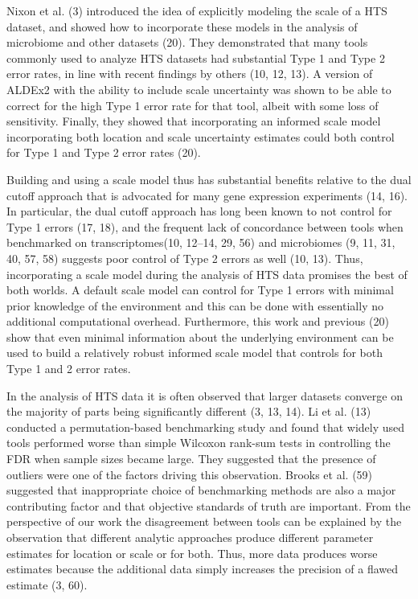 \documentclass[
]{article}
\begin{document}
Nixon et al. (3) introduced the idea of explicitly modeling the scale of
a HTS dataset, and showed how to incorporate these models in the
analysis of microbiome and other datasets (20). They demonstrated that
many tools commonly used to analyze HTS datasets had substantial Type 1
and Type 2 error rates, in line with recent findings by others (10, 12,
13). A version of ALDEx2 with the ability to include scale uncertainty
was shown to be able to correct for the high Type 1 error rate for that
tool, albeit with some loss of sensitivity. Finally, they showed that
incorporating an informed scale model incorporating both location and
scale uncertainty estimates could both control for Type 1 and Type 2
error rates (20).

Building and using a scale model thus has substantial benefits relative
to the dual cutoff approach that is advocated for many gene expression
experiments (14, 16). In particular, the dual cutoff approach has long
been known to not control for Type 1 errors (17, 18), and the frequent
lack of concordance between tools when benchmarked on transcriptomes(10,
12--14, 29, 56) and microbiomes (9, 11, 31, 40, 57, 58) suggests poor
control of Type 2 errors as well (10, 13). Thus, incorporating a scale
model during the analysis of HTS data promises the best of both worlds.
A default scale model can control for Type 1 errors with minimal prior
knowledge of the environment and this can be done with essentially no
additional computational overhead. Furthermore, this work and previous
(20) show that even minimal information about the underlying environment
can be used to build a relatively robust informed scale model that
controls for both Type 1 and 2 error rates.

In the analysis of HTS data it is often observed that larger datasets
converge on the majority of parts being significantly different (3, 13,
14). Li et al. (13) conducted a permutation-based benchmarking study and
found that widely used tools performed worse than simple Wilcoxon
rank-sum tests in controlling the FDR when sample sizes became large.
They suggested that the presence of outliers were one of the factors
driving this observation. Brooks et al. (59) suggested that
inappropriate choice of benchmarking methods are also a major
contributing factor and that objective standards of truth are important.
From the perspective of our work the disagreement between tools can be
explained by the observation that different analytic approaches produce
different parameter estimates for location or scale or for both. Thus,
more data produces worse estimates because the additional data simply
increases the precision of a flawed estimate (3, 60).
\end{document}
